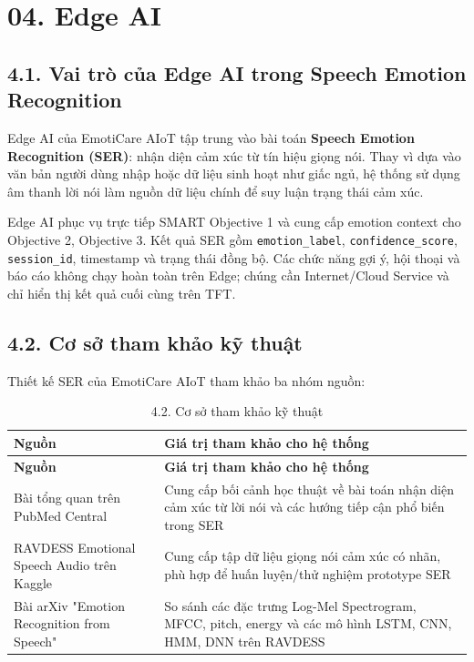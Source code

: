 \documentclass[12pt,a4paper]{article}
\begin{document}
\FloatBarrier

\clearpage
\section*{04. Edge AI}

\subsection*{4.1. Vai trò của Edge AI trong Speech Emotion Recognition}

Edge AI của EmotiCare AIoT tập trung vào bài toán \textbf{Speech Emotion Recognition (SER)}: nhận diện cảm xúc từ tín hiệu giọng nói. Thay vì dựa vào văn bản người dùng nhập hoặc dữ liệu sinh hoạt như giấc ngủ, hệ thống sử dụng âm thanh lời nói làm nguồn dữ liệu chính để suy luận trạng thái cảm xúc.


Edge AI phục vụ trực tiếp SMART Objective 1 và cung cấp emotion context cho Objective 2, Objective 3. Kết quả SER gồm \texttt{emotion\_label}, \texttt{confidence\_score}, \texttt{session\_id}, timestamp và trạng thái đồng bộ. Các chức năng gợi ý, hội thoại và báo cáo không chạy hoàn toàn trên Edge; chúng cần Internet/Cloud Service và chỉ hiển thị kết quả cuối cùng trên TFT.


\subsection*{4.2. Cơ sở tham khảo kỹ thuật}

Thiết kế SER của EmotiCare AIoT tham khảo ba nhóm nguồn:


\begin{center}
\begin{longtable}{|P{0.30\textwidth}|P{0.62\textwidth}|}
\caption{4.2. Cơ sở tham khảo kỹ thuật}\\
\hline
\textbf{Nguồn} & \textbf{Giá trị tham khảo cho hệ thống} \\
\hline
\endfirsthead
\hline
\textbf{Nguồn} & \textbf{Giá trị tham khảo cho hệ thống} \\
\hline
\endhead
Bài tổng quan trên PubMed Central & Cung cấp bối cảnh học thuật về bài toán nhận diện cảm xúc từ lời nói và các hướng tiếp cận phổ biến trong SER \\
\hline
RAVDESS Emotional Speech Audio trên Kaggle & Cung cấp tập dữ liệu giọng nói cảm xúc có nhãn, phù hợp để huấn luyện/thử nghiệm prototype SER \\
\hline
Bài arXiv "Emotion Recognition from Speech" & So sánh các đặc trưng Log-Mel Spectrogram, MFCC, pitch, energy và các mô hình LSTM, CNN, HMM, DNN trên RAVDESS \\
\hline
\end{longtable}
\end{center}
\end{document}
